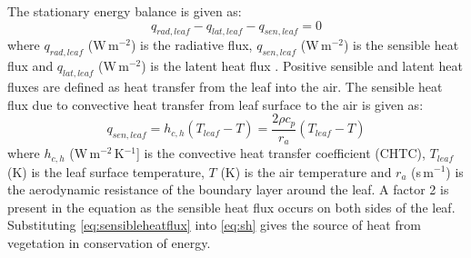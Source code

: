 The stationary energy balance is given as:
\begin{equation}
{q_{\mathit{rad},\mathit{leaf}}} - {q_{\mathit{lat},\mathit{leaf}}} - {q_{\mathit{sen},\mathit{leaf}}} = 0
\label{eq:energybalance}
\end{equation}
where ${q_{\mathit{rad},\mathit{leaf}}}$ (W\,m$^{-2}$) is the radiative flux, ${q_{\mathit{sen},\mathit{leaf}}}$ (W\,m$^{-2}$) is the sensible heat flux and ${q_{\mathit{lat},\mathit{leaf}}}$ (W\,m$^{-2}$) is the latent heat flux \citep{Majdoubi2009, Bruse1998, Dauzat2001,Hiraoka2005}. Positive sensible and latent heat fluxes are defined as heat transfer from the leaf into the air. The sensible heat flux due to convective heat transfer from leaf surface to the air is given as:
\begin{equation}
{q_{\mathit{sen,leaf}}} = {h_{c,h}} \left( {{T_{\mathit{leaf}}} - T} \right) = \frac{{2\rho {c_p}}}{{{r_a}}} \left( {{T_{\mathit{leaf}}} - T} \right)
\label{eq:sensibleheatflux}
\end{equation}
where $h_{c,h}$ (W\,m$^{-2}$\,K$^{-1}$] is the convective heat transfer coefficient (CHTC), $T_{\mathit{leaf}}$ (K) is the leaf surface temperature, $T$ (K) is the air temperature and $r_a$ (s\,m$^{-1}$) is the aerodynamic resistance of the boundary layer around the leaf. A factor 2 is present in the equation as the sensible heat flux occurs on both sides of the leaf. Substituting \cref{eq:sensibleheatflux} into \cref{eq:sh} gives the source of heat from vegetation in conservation of energy.


